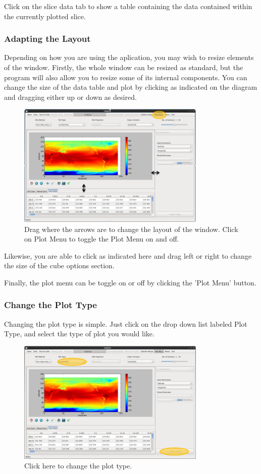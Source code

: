 \documentclass[a4paper,12pt]{article}
\begin{document}
Click on the slice data tab to show a table containing the data contained
within the currently plotted slice.

\subsubsection{Adapting the Layout}

Depending on how you are using the aplication, you may wish to resize elements
of the window. Firstly, the whole window can be resized as standard, but the
program will also allow you to resize some of its internal components. You can
change the size of the data table and plot by clicking as indicated on the
diagram and dragging either up or down as desired.

\begin{figure}[H]
\centering
\includegraphics[width=90mm]{resources/tute4.PNG}
\caption{Drag where the arrows are to change the layout of the window. Click on
Plot Menu to toggle the Plot Menu on and off.}
\label{overflow}
\end{figure}

Likewise, you are able to click as indicated here and drag left or right to
change the size of the cube options section.

Finally, the plot menu can be toggle on or off by clicking the 'Plot Menu'
button.

\subsubsection{Change the Plot Type}

Changing the plot type is simple. Just click on the drop down list labeled
Plot Type, and select the type of plot you would like.

\begin{figure}[H]
\centering
\includegraphics[width=90mm]{resources/tute5.PNG}
\caption{Click here to change the plot type.}
\label{overflow}
\end{figure}
\end{document}
